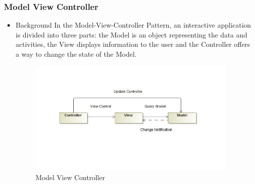 \documentclass[a4paper,12pt]{article}
\begin{document}
\subsubsection{Model View Controller}
\begin{itemize}
\item{Background}
\newline
\newline
In the Model-View-Controller Pattern, an interactive application is divided into three parts: the Model is an object representing the data and activities, the View displays information to the user and the Controller offers a way to change the state of the Model.

\begin{figure}[H]				
	\includegraphics[width=4in]{../Diagrams/Architectural Patterns/Model View Controller.jpg}
	\caption{ Model View Controller }
\end{figure}

\end{itemize}
\end{document}
